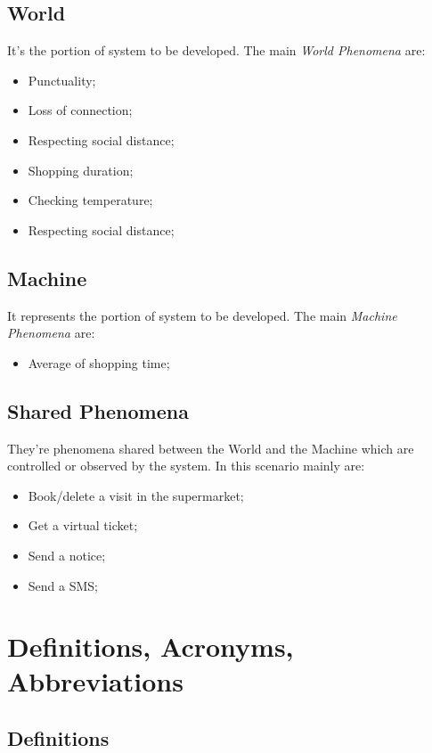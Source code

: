 \subsection{World}
It's the portion of system to be developed. The main \textit{World Phenomena} are:

\begin{itemize}
\item Punctuality;
\item Loss of connection;
\item Respecting social distance;
\item Shopping duration;
\item Checking temperature;
\item Respecting social distance;
\end{itemize}

\subsection{Machine}
It represents the portion of system to be developed. The main \textit{Machine Phenomena} are:
\begin{itemize}
\item Average of shopping time;
\end{itemize}
\subsection{Shared Phenomena} 
They're phenomena shared between the World and the Machine which are controlled or observed by the system. In this scenario mainly are:

\begin{itemize}
\item Book/delete a visit in the supermarket;
\item Get a virtual ticket;
\item Send a notice;
\item Send a SMS;

\end{itemize}


\section{Definitions, Acronyms, Abbreviations}
\subsection{Definitions}

